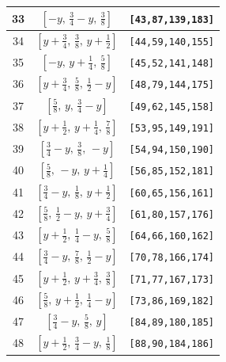 \documentclass[fleqn,8pt]{jsarticle}
\begin{document}
\begin{longtable}{ccc}
33 & $\left[ - y,\, \frac{3}{4} - y,\, \frac{3}{8} \right]$ & {\tt [43,87,139,183]} \\ \hline
34 & $\left[ y + \frac{3}{4},\, \frac{3}{8},\, y + \frac{1}{2} \right]$ & {\tt [44,59,140,155]} \\ \hline
35 & $\left[ - y,\, y + \frac{1}{4},\, \frac{5}{8} \right]$ & {\tt [45,52,141,148]} \\ \hline
36 & $\left[ y + \frac{3}{4},\, \frac{5}{8},\, \frac{1}{2} - y \right]$ & {\tt [48,79,144,175]} \\ \hline
37 & $\left[ \frac{5}{8},\, y,\, \frac{3}{4} - y \right]$ & {\tt [49,62,145,158]} \\ \hline
38 & $\left[ y + \frac{1}{2},\, y + \frac{1}{4},\, \frac{7}{8} \right]$ & {\tt [53,95,149,191]} \\ \hline
39 & $\left[ \frac{3}{4} - y,\, \frac{3}{8},\, - y \right]$ & {\tt [54,94,150,190]} \\ \hline
40 & $\left[ \frac{5}{8},\, - y,\, y + \frac{1}{4} \right]$ & {\tt [56,85,152,181]} \\ \hline
41 & $\left[ \frac{3}{4} - y,\, \frac{1}{8},\, y + \frac{1}{2} \right]$ & {\tt [60,65,156,161]} \\ \hline
42 & $\left[ \frac{5}{8},\, \frac{1}{2} - y,\, y + \frac{3}{4} \right]$ & {\tt [61,80,157,176]} \\ \hline
43 & $\left[ y + \frac{1}{2},\, \frac{1}{4} - y,\, \frac{5}{8} \right]$ & {\tt [64,66,160,162]} \\ \hline
44 & $\left[ \frac{3}{4} - y,\, \frac{7}{8},\, \frac{1}{2} - y \right]$ & {\tt [70,78,166,174]} \\ \hline
45 & $\left[ y + \frac{1}{2},\, y + \frac{3}{4},\, \frac{3}{8} \right]$ & {\tt [71,77,167,173]} \\ \hline
46 & $\left[ \frac{5}{8},\, y + \frac{1}{2},\, \frac{1}{4} - y \right]$ & {\tt [73,86,169,182]} \\ \hline
47 & $\left[ \frac{3}{4} - y,\, \frac{5}{8},\, y \right]$ & {\tt [84,89,180,185]} \\ \hline
48 & $\left[ y + \frac{1}{2},\, \frac{3}{4} - y,\, \frac{1}{8} \right]$ & {\tt [88,90,184,186]} \\
\end{longtable}
\renewcommand{\arraystretch}{1.2}
\end{document}
